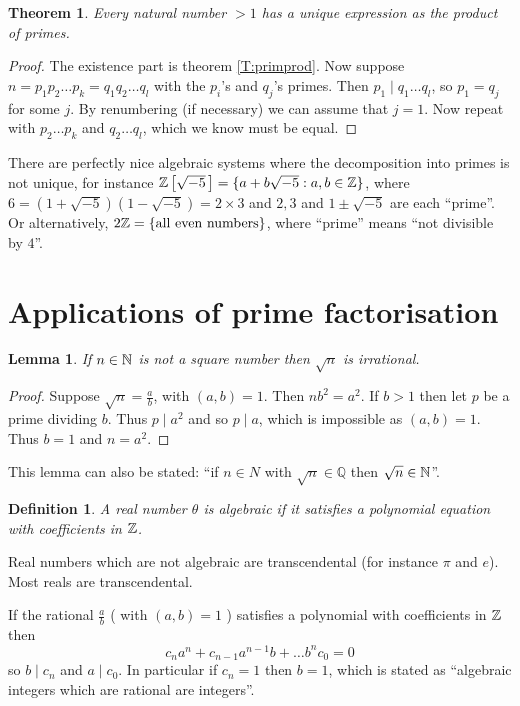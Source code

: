 \documentclass{notes}
\theoremstyle{plain}
\newtheorem{theorem}{Theorem}[chapter]
\newtheorem*{definition}{Definition}
\newtheorem{lemma}{Lemma}[chapter]
\newcommand{\Q}{\mathbb{Q}}
\begin{document}
\begin{theorem}\label{T:FTAr}
Every natural number $>1$ has a unique expression as the product of primes.
\end{theorem}

\begin{proof}
The existence part is theorem \eqref{T:primprod}.  Now suppose
$n = p_1 p_2 \dots p_k = q_1 q_2 \dots q_l$ with the $p_i$'s and $q_j$'s
primes.  Then $p_1 \mid q_1 \dots q_l$, so $p_1 = q_j$ for some $j$.
By renumbering (if necessary) we can assume that $j=1$.  Now repeat
with $p_2 \dots p_k$ and $q_2 \dots q_l$, which we know must be equal.
\end{proof}

There are perfectly nice algebraic systems where the decomposition
into primes is not unique, for instance
$\mathbb{Z}\left[\sqrt{-5}\,\right] = \{a + b \sqrt{-5} : a,b \in \mathbb{Z} \}$, where
$6=(1 + \sqrt{-5}) (1-\sqrt{-5}) = 2 \times 3$ and $2,3$ and $1 \pm
\sqrt{-5}$ are each ``prime''.  Or alternatively,
$2 \mathbb{Z} = \{ \text{all even numbers} \}$, where ``prime'' means
``not divisible by $4$''.

\section{Applications of prime factorisation}

\begin{lemma}
If $n \in \mathbb{N}$ is not a square number then $\sqrt{n}$ is irrational.
\end{lemma}

\begin{proof}
Suppose $\sqrt{n} = \frac{a}{b}$, with $(a,b) = 1$.  Then $n b^2 = a^2$.
If $b > 1$ then let $p$ be a prime dividing $b$.  Thus $p \mid a^2$ and
so $p \mid a$, which is impossible as $(a,b) = 1$.  Thus $b = 1$ and
$n = a^2$.
\end{proof}

This lemma can also be stated: ``if $n \in N$ with $\sqrt{n} \in \Q$
then $\sqrt{n} \in \mathbb{N}$''.

\begin{definition}
A real number $\theta$ is algebraic if it satisfies a polynomial equation
with coefficients in $\mathbb{Z}$.
\end{definition}

Real numbers which are not algebraic are transcendental (for
instance $\pi$ and $e$).  Most reals are transcendental.

If the rational $\frac{a}{b}$ ( with $(a,b)=1$ ) satisfies a polynomial
with coefficients in $\mathbb{Z}$ then
\[
c_n a^n + c_{n-1} a^{n-1} b + \dots b^n c_0 = 0
\]
so $b \mid c_n$ and $a \mid c_0$.  In particular if $c_n = 1$ then $b=1$,
which is stated as ``algebraic integers which are rational are integers''.
\end{document}

